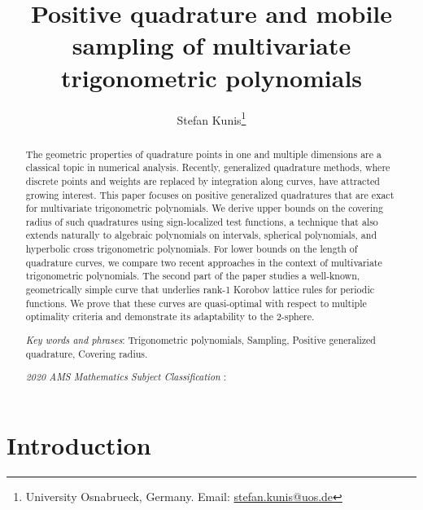 \documentclass[11pt,a4paper,twoside,final,biblatex]{scrartcl}
\title{Positive quadrature and mobile sampling of multivariate trigonometric polynomials}
\author{Stefan Kunis\footnote{University Osnabrueck, Germany. Email: \url{stefan.kunis@uos.de}}}
\theoremstyle{definition}
\numberwithin{equation}{section}
\numberwithin{table}{section}
\numberwithin{figure}{section}
\begin{document}
\date{}

\maketitle

\begin{abstract}
The geometric properties of quadrature points in one and multiple dimensions are a classical topic in numerical analysis. Recently, generalized quadrature methods, where discrete points and weights are replaced by integration along curves, have attracted growing interest.
This paper focuses on positive generalized quadratures that are exact for multivariate trigonometric polynomials.
We derive upper bounds on the covering radius of such quadratures using sign-localized test functions, a technique that also extends naturally to algebraic polynomials on intervals, spherical polynomials, and hyperbolic cross trigonometric polynomials.
For lower bounds on the length of quadrature curves, we compare two recent approaches in the context of multivariate trigonometric polynomials.
The second part of the paper studies a well-known, geometrically simple curve that underlies rank-1 Korobov lattice rules for periodic functions. We prove that these curves are quasi-optimal with respect to multiple optimality criteria and demonstrate its adaptability to the 2-sphere.

\medskip
 	\noindent\emph{Key words and phrases}:
   Trigonometric polynomials, Sampling, Positive generalized quadrature, Covering radius. %
   
 	\medskip
 	\noindent\emph{2020 AMS Mathematics Subject Classification} : 
\end{abstract}

\section{Introduction}
\end{document}
